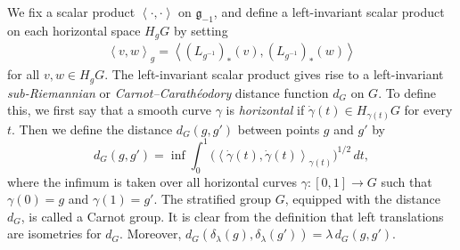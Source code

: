 \documentclass[12pt]{amsart}
\begin{document}
We fix a scalar product $\left<\cdot,\cdot\right>$ on $\mathfrak{g}_{-1}$, and define a left-invariant scalar product on each horizontal space $H_gG$ by setting
\begin{align}
\left< v, w \right>_g = \left< (L_{g^{-1}})_*(v),(L_{g^{-1}})_*(w) \right>  \label{scalarprod}
\end{align}
for all $v, w \in H_gG$.
The left-invariant scalar product gives rise to a left-invariant \emph{sub-Riemannian} or  \emph{Carnot--Carath\'eodory} distance function $d_G$ on $G$.
To define this, we first say that a smooth curve $\gamma$ is  \emph{horizontal} if $\dot\gamma(t)\in H_{\gamma(t)}G$ for every $t$.
Then we define the distance $d_G(g,g')$ between points $g$ and $g'$ by
\[
d_G(g, g') = \inf\int_0^1 \bigl( \left<  \dot\gamma(t), \dot\gamma(t) \right>_{\gamma(t)} \bigr)^{1/2}  \,dt ,
\]
where the infimum is taken over all horizontal curves $\gamma: [0, 1] \to G$ such that $\gamma(0) = g$ and $\gamma(1) = g'$.
The stratified group $G$, equipped with the distance $d_G$, is called  a {Carnot group}. It is clear from the definition that left translations are isometries for $d_G$. Moreover, $d_G(\delta_\lambda(g),\delta_\lambda(g'))=\lambda \, d_G(g,g')$.

\end{document}
